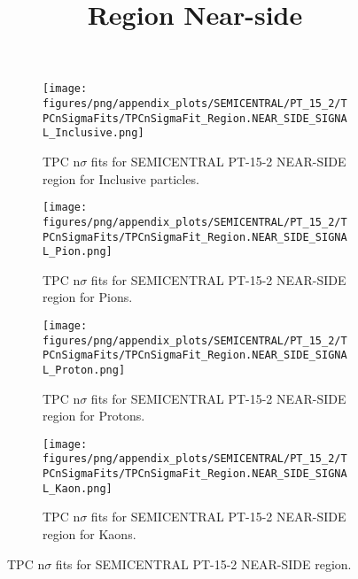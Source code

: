             \begin{figure}[H]
                \title{Region Near-side}
                \begin{subfigure}[b]{0.5\textwidth}
                    \centering
                    \texttt{[image: figures/png/appendix\_plots/SEMICENTRAL/PT\_15\_2/TPCnSigmaFits/TPCnSigmaFit\_Region.NEAR\_SIDE\_SIGNAL\_Inclusive.png]}
                    \caption{TPC n$\sigma$ fits for SEMICENTRAL PT-15-2 NEAR-SIDE region for Inclusive particles.}
                    \label{fig:appendix_SEMICENTRAL_PT-15-2_NEAR_SIDE_SIGNAL_Inclusive}
                \end{subfigure}
                \begin{subfigure}[b]{0.5\textwidth}
                    \centering
                    \texttt{[image: figures/png/appendix\_plots/SEMICENTRAL/PT\_15\_2/TPCnSigmaFits/TPCnSigmaFit\_Region.NEAR\_SIDE\_SIGNAL\_Pion.png]}
                    \caption{TPC n$\sigma$ fits for SEMICENTRAL PT-15-2 NEAR-SIDE region for Pions.}
                    \label{fig:appendix_SEMICENTRAL_PT-15-2_NEAR_SIDE_SIGNAL_Pion}
                \end{subfigure}
                \begin{subfigure}[b]{0.5\textwidth}
                    \centering
                    \texttt{[image: figures/png/appendix\_plots/SEMICENTRAL/PT\_15\_2/TPCnSigmaFits/TPCnSigmaFit\_Region.NEAR\_SIDE\_SIGNAL\_Proton.png]}
                    \caption{TPC n$\sigma$ fits for SEMICENTRAL PT-15-2 NEAR-SIDE region for Protons.}
                    \label{fig:appendix_SEMICENTRAL_PT-15-2_NEAR_SIDE_SIGNAL_Proton}
                \end{subfigure}
                \begin{subfigure}[b]{0.5\textwidth}
                    \centering
                    \texttt{[image: figures/png/appendix\_plots/SEMICENTRAL/PT\_15\_2/TPCnSigmaFits/TPCnSigmaFit\_Region.NEAR\_SIDE\_SIGNAL\_Kaon.png]}
                    \caption{TPC n$\sigma$ fits for SEMICENTRAL PT-15-2 NEAR-SIDE region for Kaons.}
                    \label{fig:appendix_SEMICENTRAL_PT-15-2_NEAR_SIDE_SIGNAL_Kaon}
                \end{subfigure}
                \caption{TPC n$\sigma$ fits for SEMICENTRAL PT-15-2 NEAR-SIDE region.}
                \label{fig:appendix_SEMICENTRAL_PT-15-2_NEAR_SIDE_SIGNAL}
            \end{figure}
